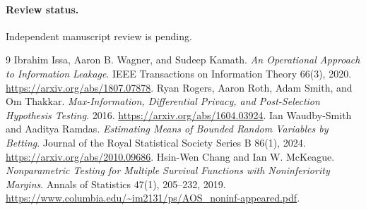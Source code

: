 \documentclass[11pt]{article}
\begin{document}
\paragraph{Review status.} Independent manuscript review is pending.

\begin{thebibliography}{9}
 Ibrahim Issa, Aaron B. Wagner, and Sudeep Kamath.
\emph{An Operational Approach to Information Leakage}.
IEEE Transactions on Information Theory 66(3), 2020.
\url{https://arxiv.org/abs/1807.07878}.
 Ryan Rogers, Aaron Roth, Adam Smith, and Om Thakkar.
\emph{Max-Information, Differential Privacy, and Post-Selection
Hypothesis Testing}. 2016. \url{https://arxiv.org/abs/1604.03924}.
 Ian Waudby-Smith and Aaditya Ramdas.
\emph{Estimating Means of Bounded Random Variables by Betting}.
Journal of the Royal Statistical Society Series B 86(1), 2024.
\url{https://arxiv.org/abs/2010.09686}.
 Hsin-Wen Chang and Ian W. McKeague.
\emph{Nonparametric Testing for Multiple Survival Functions with
Noninferiority Margins}. Annals of Statistics 47(1), 205--232, 2019.
\url{https://www.columbia.edu/~im2131/ps/AOS_noninf-appeared.pdf}.
\end{thebibliography}
\end{document}
